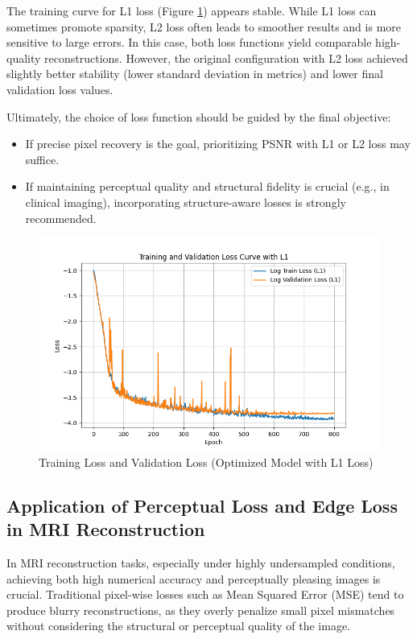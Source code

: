 \documentclass{article}
\begin{document}
The training curve for L1 loss (Figure \ref{fig:loss_l1}) appears stable. While L1 loss can sometimes promote sparsity, L2 loss often leads to smoother results and is more sensitive to large errors. In this case, both loss functions yield comparable high-quality reconstructions. However, the original configuration with L2 loss achieved slightly better stability (lower standard deviation in metrics) and lower final validation loss values.

Ultimately, the choice of loss function should be guided by the final objective:
\begin{itemize}
  \item If precise pixel recovery is the goal, prioritizing PSNR with L1 or L2 loss may suffice.
  \item If maintaining perceptual quality and structural fidelity is crucial (e.g., in clinical imaging), incorporating structure-aware losses is strongly recommended.
\end{itemize}

\begin{figure}[H]
  \centering
  \includegraphics[width=\linewidth]{../assets/Training Loss and Validation Loss L1.png}
  \caption{Training Loss and Validation Loss (Optimized Model with L1 Loss)}
  \label{fig:loss_l1}
\end{figure}


\subsection{Application of Perceptual Loss and Edge Loss in MRI Reconstruction}

In MRI reconstruction tasks, especially under highly undersampled conditions, achieving both high numerical accuracy and perceptually pleasing images is crucial. Traditional pixel-wise losses such as Mean Squared Error (MSE) tend to produce blurry reconstructions, as they overly penalize small pixel mismatches without considering the structural or perceptual quality of the image.
\end{document}
